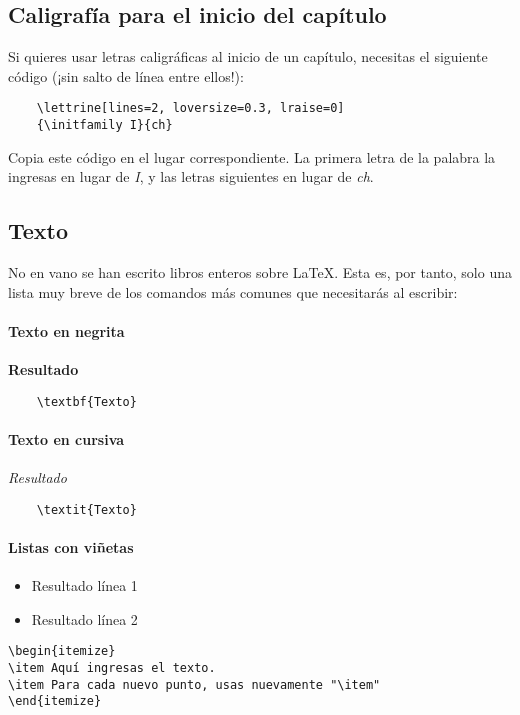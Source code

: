 \subsection{Caligrafía para el inicio del capítulo}

Si quieres usar letras caligráficas al inicio de un capítulo, necesitas el siguiente código (¡sin salto de línea entre ellos!):

\begin{verbatim}
    \lettrine[lines=2, loversize=0.3, lraise=0]
    {\initfamily I}{ch}
\end{verbatim}

Copia este código en el lugar correspondiente. La primera letra de la palabra la ingresas en lugar de \emph{I}, y las letras siguientes en lugar de \emph{ch}.

\subsection{Texto}
No en vano se han escrito libros enteros sobre \LaTeX{}. Esta es, por tanto, solo una lista muy breve de los comandos más comunes que necesitarás al escribir:

\paragraph{Texto en negrita} \textbf{Resultado}
\begin{verbatim}
    \textbf{Texto} \end{verbatim}
\paragraph{Texto en cursiva} \textit{Resultado} \begin{verbatim}
    \textit{Texto} \end{verbatim}
\paragraph{Listas con viñetas}  \begin{itemize}
        \item Resultado línea 1
        \item Resultado línea 2
    \end{itemize}
    \begin{verbatim}\begin{itemize}
\item Aquí ingresas el texto.
\item Para cada nuevo punto, usas nuevamente "\item"
\end{itemize}    \end{verbatim}
